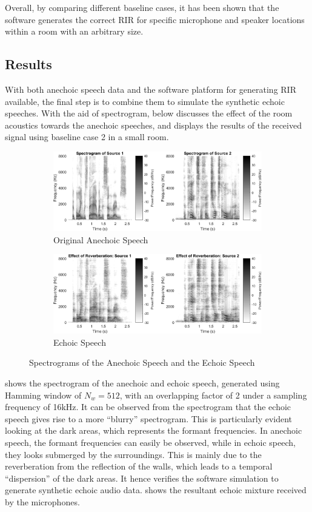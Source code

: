 \documentclass[a4paper,twoside,12pt,hidelinks]{article}
\begin{document}
Overall, by comparing different baseline cases, it has been shown that the software generates the correct RIR for specific microphone and speaker locations within a room with an arbitrary size.
\subsection{Results}
With both anechoic speech data and the software platform for generating RIR available, the final step is to combine them to simulate the synthetic echoic speeches. With the aid of spectrogram, below discusses the effect of the room acoustics towards the anechoic speeches, and displays the results of the received signal using baseline case 2 in a small room.

\begin{figure}[H]
\centering	
\begin{subfigure}[H]{0.9\textwidth}
\includegraphics[width=\textwidth]{spectsrc}
\caption{Original Anechoic Speech}
\vspace*{0.5cm}
\end{subfigure}
\begin{subfigure}[H]{0.9\textwidth}
\includegraphics[width=\textwidth]{reverb}
\caption{Echoic Speech}
\end{subfigure}
\caption{Spectrograms of the Anechoic Speech and the Echoic Speech}
\label{fig:reverberatedspeech}
\end{figure}
 shows the spectrogram of the anechoic and echoic speech, generated using Hamming window of $N_w = 512$, with an overlapping factor of 2 under a sampling frequency of 16kHz. It can be observed from the spectrogram that the echoic speech gives rise to a more ``blurry'' spectrogram. This is particularly evident looking at the dark areas, which represents the formant frequencies. In anechoic speech, the formant frequencies can easily be observed, while in echoic speech, they looks submerged by the surroundings. This is mainly due to the reverberation from the reflection of the walls, which leads to a temporal ``dispersion'' of the dark areas. It hence verifies the software simulation to generate synthetic echoic audio data.  shows the resultant echoic mixture received by the microphones.
\end{document}

